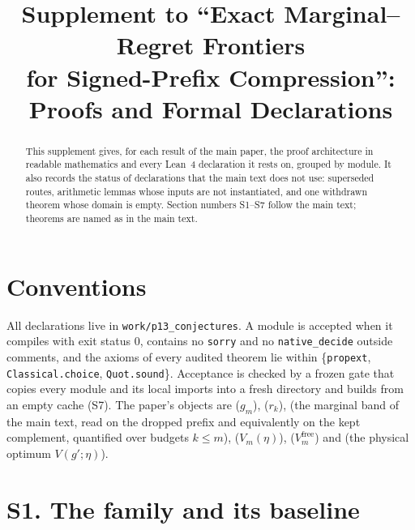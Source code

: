 



\title{Supplement to ``Exact Marginal--Regret Frontiers\\for Signed-Prefix Compression'':\\
Proofs and Formal Declarations}

\author{
}

\maketitle

\begin{abstract}
This supplement gives, for each result of the main paper, the proof architecture in
readable mathematics and every Lean~4 declaration it rests on, grouped by module. It also
records the status of declarations that the main text does not use: superseded routes,
arithmetic lemmas whose inputs are not instantiated, and one withdrawn theorem whose domain
is empty. Section numbers S1--S7 follow the main text; theorems are named as in the main
text.
\end{abstract}

\section*{Conventions}

All declarations live in \texttt{work/p13\_conjectures}. A module is accepted when it
compiles with exit status $0$, contains no \texttt{sorry} and no \texttt{native\_decide}
outside comments, and the axioms of every audited theorem lie within
\{\texttt{propext}, \texttt{Classical.choice}, \texttt{Quot.sound}\}. Acceptance is checked by
a frozen gate that copies every module and its local imports into a fresh directory and
builds from an empty cache (S7). The paper's objects are  ($g_{m}$),
 ($r_{k}$),  (the marginal band of the main text, read on
the dropped prefix and equivalently on the kept complement, quantified over budgets
$k\le m$),  ($V_{m}(\eta)$), 
($V^{\mathrm{free}}_{m}$) and  (the physical optimum $V(g';\eta)$).

\section{S1. The family and its baseline}

